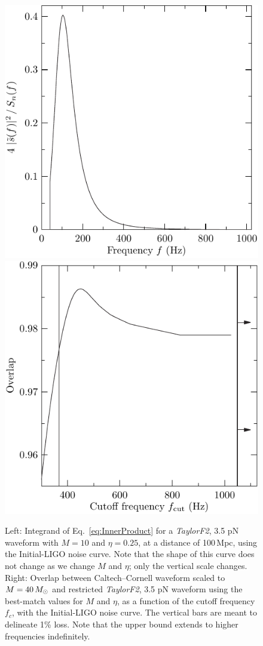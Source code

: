 \begin{figure}
  \includegraphics[width=0.50\linewidth]{figures/comparison/Integrand}
  \includegraphics[width=0.50\linewidth]{figures/comparison/Errorbars}
  \caption[Effect of cutoff frequency on overlaps]{
  \label{fig:FilterIntegrand}
    Left: Integrand of Eq.~\eqref{eq:InnerProduct} for a
    \textit{TaylorF2}, 3.5 pN waveform with $M=10$ and $\eta=0.25$, at
    a distance of 100\,Mpc, using the Initial-LIGO noise curve.  Note
    that the shape of this curve does not change as we change $M$ and
    $\eta$; only the vertical scale changes.  Right: Overlap between
    Caltech--Cornell waveform scaled to $M=40\,M_{\odot}$ and restricted
    \textit{TaylorF2}, 3.5 pN waveform using the best-match values for
    $M$ and $\eta$, as a function of the cutoff frequency $f_c$, with
    the Initial-LIGO noise curve.  The vertical bars are meant to
    delineate 1\% loss.  Note that the upper bound extends to higher
    frequencies indefinitely.  }
\end{figure}%


